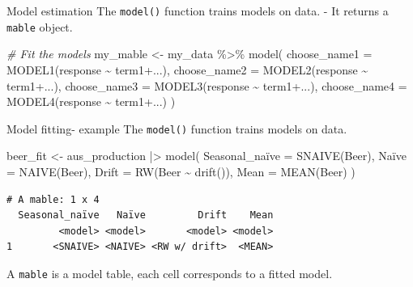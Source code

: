 \documentclass[
  14pt,
  ignorenonframetext,
  aspectratio=169,
]{beamer}
\newenvironment{Shaded}{\begin{snugshade}}{\end{snugshade}}
\newcommand{\AttributeTok}[1]{\textcolor[rgb]{0.77,0.63,0.00}{#1}}
\newcommand{\CommentTok}[1]{\textcolor[rgb]{0.56,0.35,0.01}{\textit{#1}}}
\newcommand{\FunctionTok}[1]{\textcolor[rgb]{0.00,0.00,0.00}{#1}}
\newcommand{\NormalTok}[1]{\textcolor[rgb]{0.00,0.00,0.00}{#1}}
\newcommand{\OtherTok}[1]{\textcolor[rgb]{0.56,0.35,0.01}{#1}}
\newcommand{\SpecialCharTok}[1]{\textcolor[rgb]{0.00,0.00,0.00}{#1}}
\newcommand{\StringTok}[1]{\textcolor[rgb]{0.31,0.60,0.02}{#1}}
\renewenvironment{Shaded}{\vspace*{0.15cm}\color{black}\fontsize{10}{10}\sf\begin{snugshade}\color{black}}{\end{snugshade}}
\begin{document}
\begin{frame}[fragile]{Model estimation}
\protect\hypertarget{model-estimation}{}
The \texttt{model()} function trains models on data. - It returns a
\texttt{mable} object.

\fontsize{10}{13}\sf

\begin{Shaded}
\begin{Highlighting}[]
\CommentTok{\# Fit the models}
\NormalTok{my\_mable }\OtherTok{\textless{}{-}}\NormalTok{ my\_data }\SpecialCharTok{\%\textgreater{}\%}
  \FunctionTok{model}\NormalTok{(}
    \AttributeTok{choose\_name1 =} \FunctionTok{MODEL1}\NormalTok{(response }\SpecialCharTok{\textasciitilde{}}\NormalTok{ term1}\SpecialCharTok{+}\NormalTok{...),}
    \AttributeTok{choose\_name2 =} \FunctionTok{MODEL2}\NormalTok{(response }\SpecialCharTok{\textasciitilde{}}\NormalTok{ term1}\SpecialCharTok{+}\NormalTok{...),}
    \AttributeTok{choose\_name3 =} \FunctionTok{MODEL3}\NormalTok{(response }\SpecialCharTok{\textasciitilde{}}\NormalTok{ term1}\SpecialCharTok{+}\NormalTok{...),}
    \AttributeTok{choose\_name4 =} \FunctionTok{MODEL4}\NormalTok{(response }\SpecialCharTok{\textasciitilde{}}\NormalTok{ term1}\SpecialCharTok{+}\NormalTok{...)}
\NormalTok{  )}
\end{Highlighting}
\end{Shaded}
\end{frame}

\begin{frame}[fragile]{Model fitting- example}
\protect\hypertarget{model-fitting--example}{}
The \texttt{model()} function trains models on data.

\fontsize{10}{11}\sf

\begin{Shaded}
\begin{Highlighting}[]
\NormalTok{beer\_fit }\OtherTok{\textless{}{-}}\NormalTok{ aus\_production }\SpecialCharTok{|\textgreater{}}
  \FunctionTok{model}\NormalTok{(}
    \StringTok{\textasciigrave{}}\AttributeTok{Seasonal\_naïve}\StringTok{\textasciigrave{}} \OtherTok{=} \FunctionTok{SNAIVE}\NormalTok{(Beer),}
    \StringTok{\textasciigrave{}}\AttributeTok{Naïve}\StringTok{\textasciigrave{}} \OtherTok{=} \FunctionTok{NAIVE}\NormalTok{(Beer),}
    \AttributeTok{Drift =} \FunctionTok{RW}\NormalTok{(Beer }\SpecialCharTok{\textasciitilde{}} \FunctionTok{drift}\NormalTok{()),}
    \AttributeTok{Mean =} \FunctionTok{MEAN}\NormalTok{(Beer)}
\NormalTok{  )}
\end{Highlighting}
\end{Shaded}

\begin{verbatim}
# A mable: 1 x 4
  Seasonal_naïve   Naïve         Drift    Mean
         <model> <model>       <model> <model>
1       <SNAIVE> <NAIVE> <RW w/ drift>  <MEAN>
\end{verbatim}

\vspace*{0.2cm}\begin{alertblock}{}
A \texttt{mable} is a model table, each cell corresponds to a fitted model.
\end{alertblock}
\end{frame}
\end{document}
